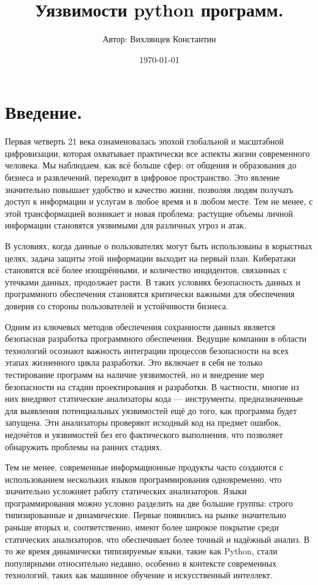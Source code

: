 \documentclass[a4paper,12pt]{article} %
\title{Уязвимости python программ.}  %
\author{Автор: Вихлянцев Константин} %
\date{\today}
\begin{document}
	\maketitle %

	\section{Введение.}
		Первая четверть 21 века ознаменовалась эпохой глобальной и масштабной цифровизации, которая охватывает практически все аспекты жизни современного человека. Мы наблюдаем, как всё больше сфер: от общения и образования до бизнеса и развлечений, переходит в цифровое пространство. Это явление значительно повышает удобство и качество жизни, позволяя людям получать доступ к информации и услугам в любое время и в любом месте. Тем не менее, с этой трансформацией возникает и новая проблема: растущие объемы личной информации становятся уязвимыми для различных угроз и атак.

		\par В условиях, когда данные о пользователях могут быть использованы в корыстных целях, задача защиты этой информации выходит на первый план. Кибератаки становятся всё более изощрёнными, и количество инцидентов, связанных с утечками данных, продолжает расти. В таких условиях безопасность данных и программного обеспечения становятся критически важными для обеспечения доверия со стороны пользователей и устойчивости бизнеса.

		\par Одним из ключевых методов обеспечения сохранности данных является безопасная разработка программного обеспечения. Ведущие компании в области технологий осознают важность интеграции процессов безопасности на всех этапах жизненного цикла разработки. Это включает в себя не только тестирование программ на наличие уязвимостей, но и внедрение мер безопасности на стадии проектирования и разработки. В частности, многие из них внедряют статические анализаторы кода — инструменты, предназначенные для выявления потенциальных уязвимостей ещё до того, как программа будет запущена. Эти анализаторы проверяют исходный код на предмет ошибок, недочётов и уязвимостей без его фактического выполнения, что позволяет обнаружить проблемы на ранних стадиях.

		\par Тем не менее, современные информационные продукты часто создаются с использованием нескольких языков программирования одновременно, что значительно усложняет работу статических анализаторов. Языки программирования можно условно разделить на две большие группы: строго типизированные и динамические. Первые появились на рынке значительно раньше вторых и, соответственно, имеют более широкое покрытие среди статических анализаторов, что обеспечивает более точный и надёжный анализ. В то же время динамически типизируемые языки, такие как Python, стали популярными относительно недавно, особенно в контексте современных технологий, таких как машинное обучение и искусственный интеллект.
\end{document}
